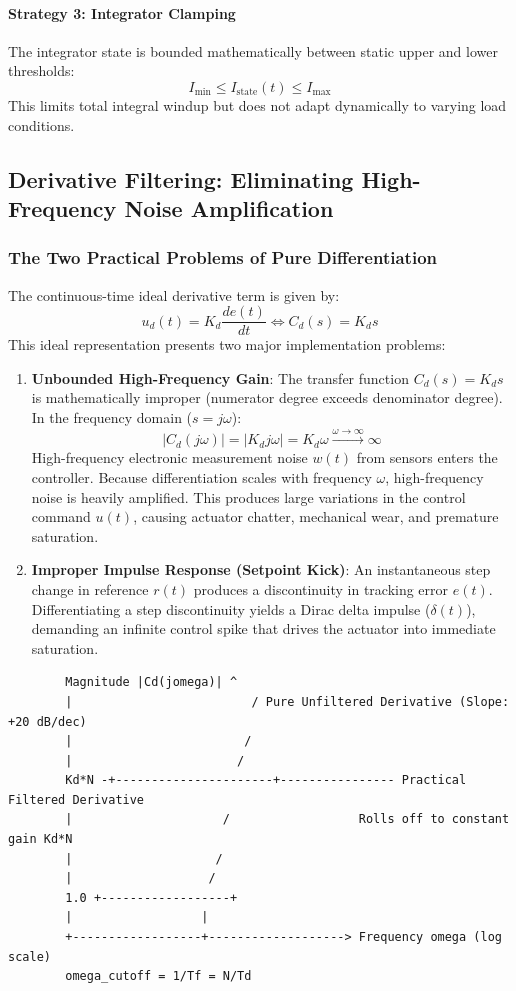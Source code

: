 \documentclass[12pt,onecolumn,twoside ]{article}
\begin{document}
	\paragraph{Strategy 3: Integrator Clamping}
	The integrator state is bounded mathematically between static upper and lower thresholds: \[
	I_{\min} \le I_{\text{state}}(t) \le I_{\max}
	\] This limits total integral windup but does not adapt dynamically to varying load conditions.
	
	\subsection{Derivative Filtering: Eliminating High-Frequency Noise Amplification}
	\subsubsection{The Two Practical Problems of Pure Differentiation}
	The continuous-time ideal derivative term is given by: \[
	u_d(t) = K_d \frac{de(t)}{dt} \iff C_d(s) = K_d s
	\] This ideal representation presents two major implementation problems:
	\begin{enumerate}
		\item
		\textbf{Unbounded High-Frequency Gain}: The transfer function $C_d(s) = K_d s$ is mathematically improper (numerator degree exceeds denominator degree). In the frequency domain ($s = j\omega$): \[
		|C_d(j\omega)| = |K_d j\omega| = K_d \omega \xrightarrow{\omega \to \infty} \infty
		\] High-frequency electronic measurement noise $w(t)$ from sensors enters the controller. Because differentiation scales with frequency $\omega$, high-frequency noise is heavily amplified. This produces large variations in the control command $u(t)$, causing actuator chatter, mechanical wear, and premature saturation.
		\item
		\textbf{Improper Impulse Response (Setpoint Kick)}: An instantaneous step change in reference $r(t)$ produces a discontinuity in tracking error $e(t)$. Differentiating a step discontinuity yields a Dirac delta impulse ($\delta(t)$), demanding an infinite control spike that drives the actuator into immediate saturation.
	\end{enumerate}
	\begin{lstlisting}
		Magnitude |Cd(jomega)| ^
		|                         / Pure Unfiltered Derivative (Slope: +20 dB/dec)
		|                        /
		|                       /
		Kd*N -+----------------------+---------------- Practical Filtered Derivative
		|                     /                  Rolls off to constant gain Kd*N
		|                    /
		|                   /
		1.0 +------------------+
		|                  |
		+------------------+-------------------> Frequency omega (log scale)
		omega_cutoff = 1/Tf = N/Td
	\end{lstlisting}
	
\end{document}

